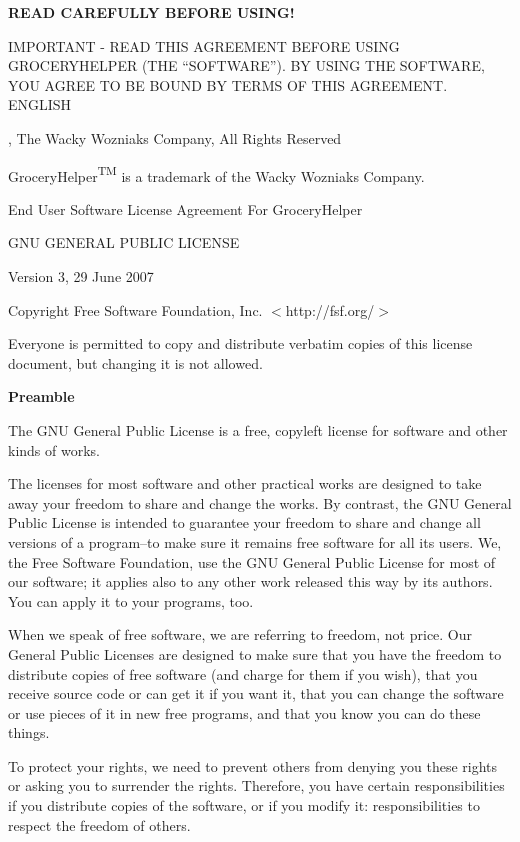 \documentclass[letterpaper,12pt]{article}
\begin{document}
\vspace*{-1em}

{\large \textbf{READ CAREFULLY BEFORE USING!}}

{\fontsize{6}{6}\selectfont

IMPORTANT - READ THIS AGREEMENT BEFORE USING GROCERYHELPER (THE ``SOFTWARE''). BY USING THE SOFTWARE, YOU AGREE TO BE BOUND BY TERMS OF THIS AGREEMENT.
ENGLISH 

, The Wacky Wozniaks Company, All Rights Reserved

GroceryHelper{\fontsize{5.5}{5.5}\selectfont \textsuperscript{TM}} is a trademark of the Wacky Wozniaks Company.

\begin{center}
End User Software License Agreement For GroceryHelper


GNU GENERAL PUBLIC LICENSE

Version 3, 29 June 2007
\end{center}

Copyright  Free Software Foundation, Inc. $<$http://fsf.org/$>$

Everyone is permitted to copy and distribute verbatim copies of this license document, but changing it is not allowed.

\textbf{Preamble}

The GNU General Public License is a free, copyleft license for software and other kinds of works.

The licenses for most software and other practical works are designed to take away your freedom to share and change the works. By contrast, the GNU General Public License is intended to guarantee your freedom to share and change all versions of a program--to make sure it remains free software for all its users. We, the Free Software Foundation, use the GNU General Public License for most of our software; it applies also to any other work released this way by its authors. You can apply it to your programs, too.

When we speak of free software, we are referring to freedom, not price. Our General Public Licenses are designed to make sure that you have the freedom to distribute copies of free software (and charge for them if you wish), that you receive source code or can get it if you want it, that you can change the software or use pieces of it in new free programs, and that you know you can do these things.

To protect your rights, we need to prevent others from denying you these rights or asking you to surrender the rights. Therefore, you have certain responsibilities if you distribute copies of the software, or if you modify it: responsibilities to respect the freedom of others.

}
\end{document}
